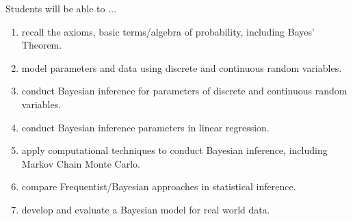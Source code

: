 \documentclass[11pt,onecolumn]{article}
\begin{document}
Students will be able to $\ldots$

\begin{enumerate}
  \itemsep0em

  \item recall the axioms, basic terms/algebra of probability, including Bayes' Theorem.
\item model parameters and data using discrete and continuous random variables.
\item conduct Bayesian inference for parameters of discrete and continuous random variables.
\item conduct Bayesian inference parameters in linear regression.
\item apply computational techniques to conduct Bayesian inference, including Markov Chain Monte Carlo.
\item compare Frequentist/Bayesian approaches in statistical inference.
\item develop and evaluate a Bayesian model for real world data.

\end{enumerate}
\end{document}
